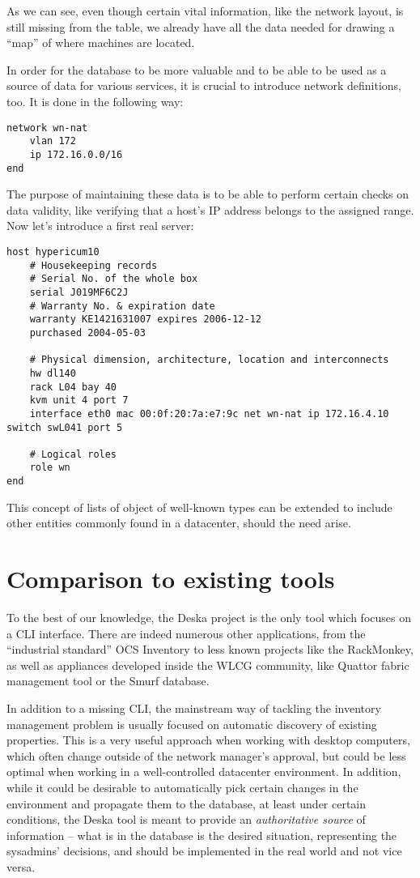 \documentclass[11pt]{article}
\begin{document}
As we can see, even though certain vital information, like the network layout,
is still missing from the table, we already have all the data needed for drawing
a ``map'' of where machines are located.

In order for the database to be more valuable and to be able to be used as a
source of data for various services, it is crucial to introduce network
definitions, too.  It is done in the following way:

{\scriptsize
\begin{verbatim}
network wn-nat
    vlan 172
    ip 172.16.0.0/16
end
\end{verbatim}
}

The purpose of maintaining these data is to be able to perform certain checks on
data validity, like verifying that a host's IP address belongs to the assigned
range.  Now let's introduce a first real server:

{\scriptsize
\begin{verbatim}
host hypericum10
    # Housekeeping records
    # Serial No. of the whole box
    serial J019MF6C2J
    # Warranty No. & expiration date
    warranty KE1421631007 expires 2006-12-12
    purchased 2004-05-03

    # Physical dimension, architecture, location and interconnects
    hw dl140
    rack L04 bay 40
    kvm unit 4 port 7
    interface eth0 mac 00:0f:20:7a:e7:9c net wn-nat ip 172.16.4.10 switch swL041 port 5

    # Logical roles
    role wn
end
\end{verbatim}
}

This concept of lists of object of well-known types can be extended to include
other entities commonly found in a datacenter, should the need arise.

\section{Comparison to existing tools}

To the best of our knowledge, the Deska project is the only tool which focuses on
a CLI interface.  There are indeed numerous other applications, from the
``industrial standard'' OCS Inventory to less known projects like the
RackMonkey, as well as appliances developed inside the WLCG community, like
Quattor fabric management tool or the Smurf database.

In addition to a missing CLI, the mainstream way of tackling the inventory
management problem is usually focused on automatic discovery of existing
properties.  This is a very useful approach when working with desktop computers,
which often change outside of the network manager's approval, but could be less
optimal when working in a well-controlled datacenter environment.  In addition,
while it could be desirable to automatically pick certain changes in the
environment and propagate them to the database, at least under certain
conditions, the Deska tool is meant to provide an {\em authoritative source} of
information -- what is in the database is the desired situation, representing
the sysadmins' decisions, and should be implemented in the real world and not
vice versa.
\end{document}
